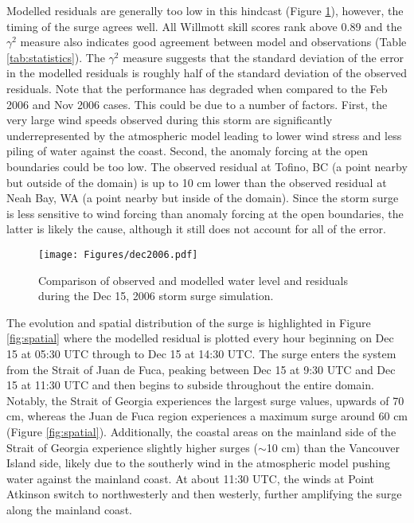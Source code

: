 \documentclass[letterpaper]{tATO2e}
\begin{document}
Modelled residuals are generally too low in this hindcast (Figure \ref{fig:dec2006}), however, the timing of the surge agrees well. All Willmott skill scores rank above {\color{red}0.89} and the $\gamma^2$ measure also indicates good agreement between model and observations (Table \ref{tab:statistics}). The $\gamma^2$ measure suggests that the standard deviation of the error in the modelled residuals is roughly half of the standard deviation of the observed residuals. Note that the performance has degraded when compared to the Feb 2006 and Nov 2006 cases. This could be due to a number of factors. First, the very large wind speeds observed during this storm are significantly underrepresented by the atmospheric model leading to lower wind stress and less piling of water against the coast. Second, the anomaly forcing at the open boundaries could be too low. The observed residual at Tofino, BC (a point nearby but outside of the domain) is up to 10 cm  lower than the observed residual at Neah Bay, WA (a point nearby but inside of the domain). {\color{red} Since the storm surge is less sensitive to wind forcing than anomaly forcing at the open boundaries, the latter is likely the cause, although it still does not account for all of the error.} 

\begin{figure}
\centering
\texttt{[image: Figures/dec2006.pdf]}
\caption{Comparison of observed and modelled water level and residuals during the Dec 15, 2006 storm surge simulation. }
\label{fig:dec2006}
\end{figure}

The evolution and spatial distribution of the surge is highlighted in Figure \ref{fig:spatial} where the modelled residual is plotted every hour beginning on Dec 15 at 05:30 UTC through to Dec 15 at 14:30 UTC. The surge enters the system from the Strait of Juan de Fuca, peaking between Dec 15 at 9:30 UTC and Dec 15 at 11:30 UTC and then begins to subside throughout the entire domain. Notably, the Strait of Georgia experiences the largest surge values, upwards of {\color{red}70 cm}, whereas the Juan de Fuca region experiences a maximum surge around {\color{red}60 cm} {\color{red} (Figure \ref{fig:spatial})}. Additionally, the coastal areas on the mainland side of the Strait of Georgia experience slightly higher surges ($\sim$10 cm) than the Vancouver Island side, likely due to the southerly wind in the atmospheric model pushing water against the mainland coast. At about 11:30 UTC, the winds at Point Atkinson switch to northwesterly and then westerly, further amplifying the surge along the mainland coast. 
\end{document}
